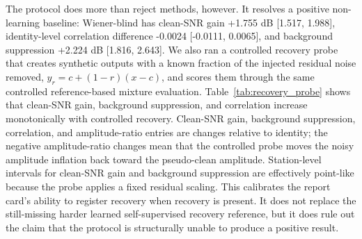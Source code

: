 \documentclass[review,12pt,authoryear]{elsarticle}
\begin{document}
The protocol does more than reject methods, however. It resolves a positive non-learning baseline: Wiener-blind has clean-SNR gain +1.755 dB [1.517, 1.988], identity-level correlation difference -0.0024 [-0.0111, 0.0065], and background suppression +2.224 dB [1.816, 2.643]. We also ran a controlled recovery probe that creates synthetic outputs with a known fraction of the injected residual noise removed, $y_r=c+(1-r)(x-c)$, and scores them through the same controlled reference-based mixture evaluation. Table~\ref{tab:recovery_probe} shows that clean-SNR gain, background suppression, and correlation increase monotonically with controlled recovery. Clean-SNR gain, background suppression, correlation, and amplitude-ratio entries are changes relative to identity; the negative amplitude-ratio changes mean that the controlled probe moves the noisy amplitude inflation back toward the pseudo-clean amplitude. Station-level intervals for clean-SNR gain and background suppression are effectively point-like because the probe applies a fixed residual scaling. This calibrates the report card's ability to register recovery when recovery is present. It does not replace the still-missing harder learned self-supervised recovery reference, but it does rule out the claim that the protocol is structurally unable to produce a positive result.

\begin{table}[!htbp]
\centering
\caption{No-taper controlled recovery probe on the controlled reference-based mixture evaluation. Entries are changes relative to identity; negative amplitude-ratio changes indicate reduced noisy-amplitude inflation rather than an error in the recovery direction. Clean-SNR and background-suppression intervals collapse to points because these gains are analytically determined by the recovery fraction, $-20\log_{10}(1-f)$.}
\label{tab:recovery_probe}
\small
\resizebox{\linewidth}{!}{}
\end{table}
\end{document}
